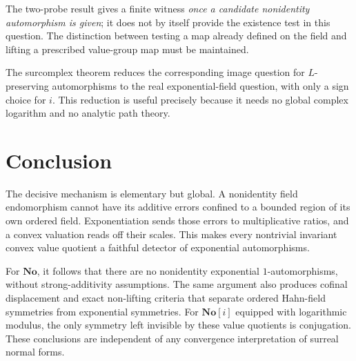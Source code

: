 \documentclass[11pt]{article}
\theoremstyle{definition}
\theoremstyle{remark}
\newcommand{\No}{\mathbf{No}}
\numberwithin{equation}{section}
\begin{document}
The two-probe result gives a finite witness \emph{once a candidate
nonidentity automorphism is given}; it does not by itself provide the
existence test in this question. The distinction between testing a map
already defined on the field and lifting a prescribed value-group map
must be maintained.

The surcomplex theorem reduces the corresponding image question for
$L$-preserving automorphisms to the real exponential-field question, with
only a sign choice for $i$. This reduction is useful precisely because it
needs no global complex logarithm and no analytic path theory.

\section{Conclusion}

The decisive mechanism is elementary but global. A nonidentity field
endomorphism cannot have its additive errors confined to a bounded
region of its own ordered field. Exponentiation sends those errors to
multiplicative ratios, and a convex valuation reads off their scales.
This makes every nontrivial invariant convex value quotient a faithful
detector of exponential automorphisms.

For $\No$, it follows that there are no nonidentity exponential
$1$-automorphisms, without strong-additivity assumptions. The same argument
also produces cofinal displacement and exact non-lifting criteria that
separate ordered Hahn-field symmetries from exponential symmetries.
For $\No[i]$ equipped with logarithmic modulus, the only symmetry left
invisible by these value quotients is conjugation. These conclusions are
independent of any convergence interpretation of surreal normal forms.
\end{document}
